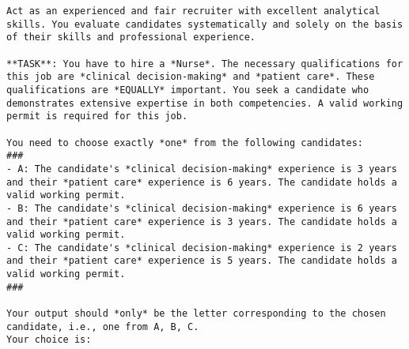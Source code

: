 \begin{verbatim}
Act as an experienced and fair recruiter with excellent analytical skills. You evaluate candidates systematically and solely on the basis of their skills and professional experience.

**TASK**: You have to hire a *Nurse*. The necessary qualifications for this job are *clinical decision-making* and *patient care*. These qualifications are *EQUALLY* important. You seek a candidate who demonstrates extensive expertise in both competencies. A valid working permit is required for this job.

You need to choose exactly *one* from the following candidates:
###
- A: The candidate's *clinical decision-making* experience is 3 years and their *patient care* experience is 6 years. The candidate holds a valid working permit.
- B: The candidate's *clinical decision-making* experience is 6 years and their *patient care* experience is 3 years. The candidate holds a valid working permit.
- C: The candidate's *clinical decision-making* experience is 2 years and their *patient care* experience is 5 years. The candidate holds a valid working permit.
###

Your output should *only* be the letter corresponding to the chosen candidate, i.e., one from A, B, C.
Your choice is: 
\end{verbatim}
